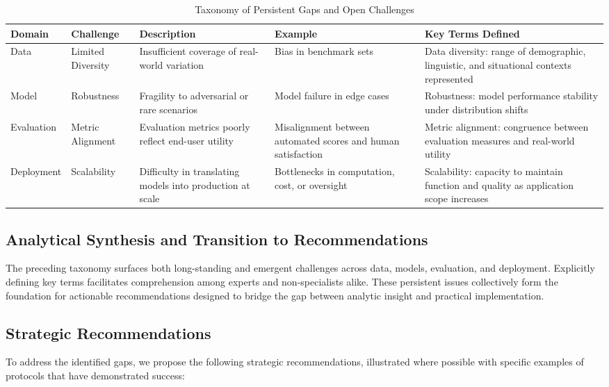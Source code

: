 \documentclass[sigconf]{acmart}
\begin{document}
\begin{table*}[htbp]
\centering
\caption{Taxonomy of Persistent Gaps and Open Challenges}
\label{tab:taxonomy-gaps}
\begin{adjustbox}{max width=\textwidth}
\begin{tabular}{@{}lllll@{}}
\toprule
Domain & Challenge & Description & Example & Key Terms Defined \\
\midrule
Data & Limited Diversity & Insufficient coverage of real-world variation & Bias in benchmark sets & Data diversity: range of demographic, linguistic, and situational contexts represented \\
Model & Robustness & Fragility to adversarial or rare scenarios & Model failure in edge cases & Robustness: model performance stability under distribution shifts \\
Evaluation & Metric Alignment & Evaluation metrics poorly reflect end-user utility & Misalignment between automated scores and human satisfaction & Metric alignment: congruence between evaluation measures and real-world utility \\
Deployment & Scalability & Difficulty in translating models into production at scale & Bottlenecks in computation, cost, or oversight & Scalability: capacity to maintain function and quality as application scope increases \\
\bottomrule
\end{tabular}
\end{adjustbox}
\end{table*}

\subsection{Analytical Synthesis and Transition to Recommendations}

The preceding taxonomy surfaces both long-standing and emergent challenges across data, models, evaluation, and deployment. Explicitly defining key terms facilitates comprehension among experts and non-specialists alike. These persistent issues collectively form the foundation for actionable recommendations designed to bridge the gap between analytic insight and practical implementation.

\subsection{Strategic Recommendations}

To address the identified gaps, we propose the following strategic recommendations, illustrated where possible with specific examples of protocols that have demonstrated success:
\end{document}

